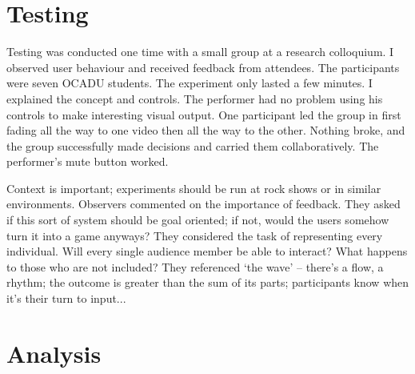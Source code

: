 \section{Testing}

Testing was conducted one time with a small group at a research colloquium. I observed user behaviour and received feedback from attendees. The participants were seven OCADU students. The experiment only lasted a few minutes. I explained the concept and controls. The performer had no problem using his controls to make interesting visual output. One participant led the group in first fading all the way to one video then all the way to the other. Nothing broke, and the group successfully made decisions and carried them collaboratively. The performer's mute button worked.

Context is important; experiments should be run at rock shows or in similar environments. Observers commented on the importance of feedback. They asked if this sort of system should be goal oriented; if not, would the users somehow turn it into a game anyways? They considered the task of representing every individual. Will every single audience member be able to interact? What happens to those who are not included? They referenced `the wave' -- there's a flow, a rhythm; the outcome is greater than the sum of its parts; participants know when it's their turn to input...


\section{Analysis}

